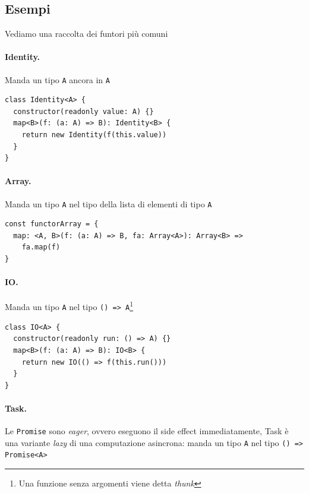\documentclass[12pt]{article}
\begin{document}
\subsection{Esempi}

Vediamo una raccolta dei funtori più comuni

\paragraph{Identity.}

Manda un tipo \texttt{A} ancora in \texttt{A}

\begin{verbatim}
class Identity<A> {
  constructor(readonly value: A) {}
  map<B>(f: (a: A) => B): Identity<B> {
    return new Identity(f(this.value))
  }
}
\end{verbatim}

\paragraph{Array.}

Manda un tipo \texttt{A} nel tipo della lista di elementi di tipo \texttt{A}

\begin{verbatim}
const functorArray = {
  map: <A, B>(f: (a: A) => B, fa: Array<A>): Array<B> =>
    fa.map(f)
}
\end{verbatim}

\paragraph{IO.}

Manda un tipo \texttt{A} nel tipo \texttt{() => A}\footnote{Una funzione senza argomenti viene detta \emph{thunk}}

\begin{verbatim}
class IO<A> {
  constructor(readonly run: () => A) {}
  map<B>(f: (a: A) => B): IO<B> {
    return new IO(() => f(this.run()))
  }
}
\end{verbatim}

\paragraph{Task.}

Le \texttt{Promise} sono \emph{eager}, ovvero eseguono il side effect immediatamente, Task è una variante \emph{lazy}
di una computazione asincrona: manda un tipo \texttt{A} nel tipo \texttt{() => Promise<A>}
\end{document}
